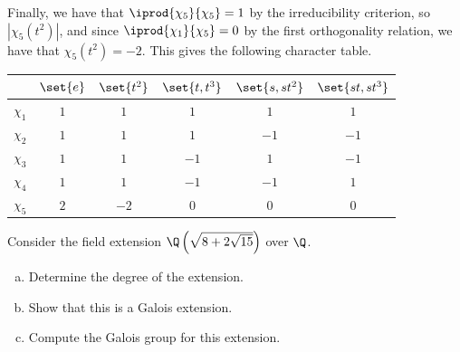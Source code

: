 \documentclass[10pt]{mypackage}
\begin{document}
\begin{solution}
\begin{enumerate}[(a)]
      Finally, we have that $ \iprod{\chi_5}{\chi_5} = 1 $ by the irreducibility criterion, so $\left\vert \chi_5\left( t^2 \right) \right\vert$, and since $ \iprod{\chi_1}{\chi_5} = 0 $ by the first orthogonality relation, we have that $\chi_5\left( t^2 \right) = -2$. This gives the following character table.
      \begin{center}
        \begin{tabular}{c|c|c|c|c|c}
          & $\set{e}$ & $\set{t^2}$ & $\set{t,t^3}$ & $\set{s,st^2}$ & $\set{st,st^3}$\\
          \hline
          $\chi_1$ & $1$ & $1$ & $1$ & $1$ & $1$\\
          $\chi_2$ & $1$ & $1$ & $1$ & $-1$ & $-1$\\
          $\chi_3$ & $1$ & $1$ & $-1$ & $1$ & $-1$\\
          $\chi_4$ & $1$ & $1$ & $-1$ & $-1$ & $1$\\
          $\chi_5$ & $2$ & $-2$ & $0$ & $0$ & $0$\\
          \hline
        \end{tabular}
      \end{center}
  \end{enumerate}
\end{solution}
\begin{problem}[Problem 7]
  Consider the field extension $\Q\left( \sqrt{8 + 2\sqrt{15}} \right)$ over $\Q$.
  \begin{enumerate}[(a)]
    \item Determine the degree of the extension.
    \item Show that this is a Galois extension.
    \item Compute the Galois group for this extension.
  \end{enumerate}
\end{problem}
\end{document}
